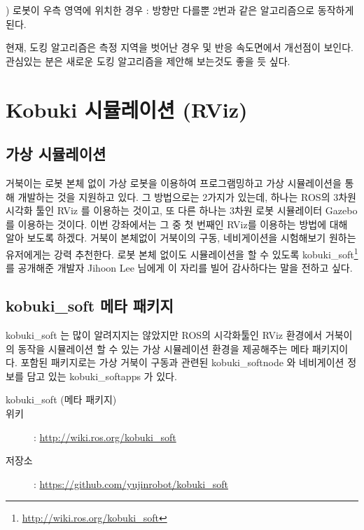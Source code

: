 \vspace{\baselineskip}
\noindent
{}
\thenum) 로봇이 우측 영역에 위치한 경우
: 방향만 다를뿐 2번과 같은 알고리즘으로 동작하게 된다.

현재, 도킹 알고리즘은 측정  지역을 벗어난 경우 및 반응 속도면에서 개선점이 보인다. 관심있는 분은 새로운 도킹 알고리즘을 제안해 보는것도 좋을 듯 싶다.


\section{Kobuki 시뮬레이션 (RViz)}

\subsection{가상 시뮬레이션}

거북이는 로봇 본체 없이 가상 로봇을 이용하여 프로그램밍하고 가상 시뮬레이션을 통해 개발하는 것을 지원하고 있다. 그 방법으로는 2가지가 있는데, 하나는 ROS의 3차원 시각화 툴인 RViz 를 이용하는 것이고, 또 다른 하나는 3차원 로봇 시뮬레이터 Gazebo를 이용하는 것이다. 이번 강좌에서는 그 중 첫 번째인 RViz를 이용하는 방법에 대해 알아 보도록 하겠다. 거북이 본체없이 거북이의 구동, 네비게이션을 시험해보기 원하는 유저에게는 강력 추천한다. 로봇 본체 없이도 시뮬레이션을 할 수 있도록 kobuki\_soft\footnote{\url{http://wiki.ros.org/kobuki_soft}} 를 공개해준 개발자 Jihoon Lee 님에게 이 자리를 빌어 감사하다는 말을 전하고 싶다.

\subsection{kobuki\_soft 메타 패키지}

kobuki\_soft 는 많이 알려지지는 않았지만 ROS의 시각화툴인 RViz 환경에서 거북이의 동작을 시뮬레이션 할 수 있는 가상 시뮬레이션 환경을 제공해주는 메타 패키지이다. 포함된 패키지로는 가상 거북이 구동과 관련된 kobuki\_softnode 와 네비게이션 정보를 담고 있는 kobuki\_softapps 가 있다. 

\vspace{\baselineskip}
\begin{description}
\item[kobuki\_soft (메타 패키지)]
\item[위키]: \url{http://wiki.ros.org/kobuki_soft}
\item[저장소]: \url{https://github.com/yujinrobot/kobuki_soft}
\end{description}

